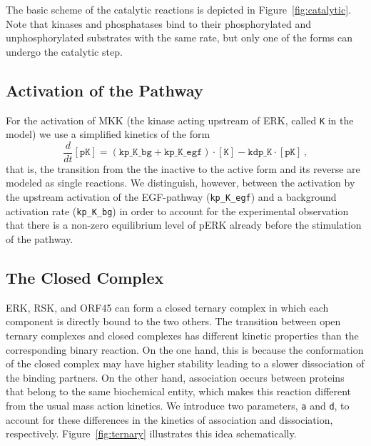 \documentclass[12pt]{article}
\begin{document}
	The basic scheme of the catalytic reactions is depicted in Figure~\ref{fig:catalytic}. Note that kinases
	and phosphatases bind to their phosphorylated and unphosphorylated
	substrates with the same rate, but only one of the forms can undergo
	the catalytic step.
	
	\subsection{Activation of the Pathway}
	
	\label{sss:activation} For the activation of MKK (the kinase acting
	upstream of ERK, called \texttt{K} in the model) we use a simplified kinetics of the form 
	\begin{equation}
		\frac{d}{dt}[\texttt{pK}]=(\texttt{kp\_K\_bg}+\texttt{kp\_K\_egf})\cdot[\texttt{K}]-\texttt{kdp\_K}\cdot[\texttt{pK}]\,,\label{eq:kin}
	\end{equation}
	that is, the transition from the the inactive to the active form and
	its reverse are modeled as single reactions. We distinguish, however,
	between the activation by the upstream activation of the EGF-pathway
	(\texttt{kp\_K\_egf}) and a background activation rate (\texttt{kp\_K\_bg})
	in order to account for the experimental observation that there is
	a non-zero equilibrium level of pERK already before the stimulation
	of the pathway.
	
	\subsection{The Closed Complex}
	
	ERK, RSK, and ORF45 can form a closed ternary complex in which each component is directly bound to the two others. The transition between open ternary complexes and closed complexes has different kinetic properties than the corresponding binary reaction. On the one hand, this is because the conformation of the closed complex may have higher stability leading to a slower dissociation of the binding partners.
	On the other hand, association occurs between proteins that belong
	to the same biochemical entity, which makes this reaction different
	from the usual mass action kinetics. We introduce two parameters,
	\texttt{a} and \texttt{d}, to account for these differences in the
	kinetics of association and dissociation, respectively. Figure~\ref{fig:ternary}
	illustrates this idea schematically.
	
\end{document}
